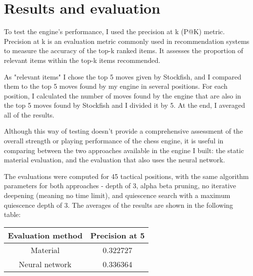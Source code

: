 \chapter{Results and evaluation}
\label{chap:ch6}


To test the engine's performance, I used the precision at k (P@K) metric. Precision at k is an evaluation metric commonly used in recommendation systems to measure the accuracy of the top-k ranked items. It assesses the proportion of relevant items within the top-k items recommended.

As "relevant items" I chose the top 5 moves given by Stockfish, and I compared them to the top 5 moves found by my engine in several positions. For each position, I calculated the number of moves found by the engine that are also in the top 5 moves found by Stockfish and I divided it by 5. At the end, I averaged all of the results.

Although this way of testing doesn't provide a comprehensive assessment of the overall strength or playing performance of the chess engine, it is useful in comparing between the two approaches available in the engine I built: the static material evaluation, and the evaluation that also uses the neural network.

The evaluations were computed for 45 tactical positions, with the same algorithm parameters for both approaches - depth of 3, alpha beta pruning, no iterative deepening (meaning no time limit), and quiescence search with a maximum quiescence depth of 3. The averages of the results are shown in the following table:


\begin{center}
    \begin{tabular}{ |c|c| }
        \hline
        \textbf{Evaluation method} & \textbf{Precision at 5} \\
        \hline
        Material & 0.322727 \\
        \hline
        Neural network & 0.336364 \\
        \hline
    \end{tabular}
\end{center}

